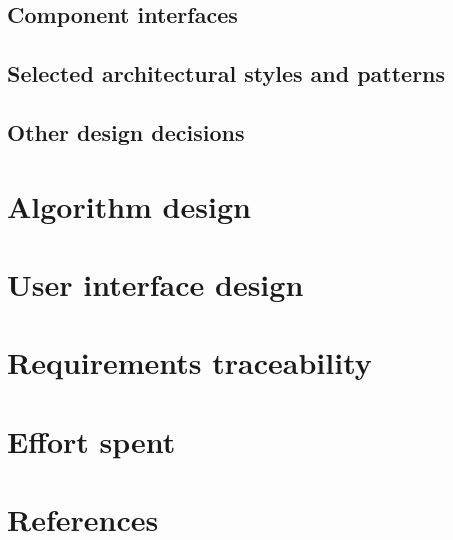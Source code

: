 \documentclass[12pt, a4paper]{article}
\begin{document}
		\subsection{Component interfaces}
		\label{sec:components_interfaces}
			

		\subsection{Selected  architectural  styles  and  patterns}
			
			

		\subsection{Other design decisions}
			

	\newpage
	\section{Algorithm design}
	\label{sec:algorithm_design}
		

	\newpage
	\section{User interface design}
	\label{sec:user_interface_design}
		

	\newpage
	\section{Requirements traceability}
		

	\newpage
	\section{Effort spent}

	\newpage
	\section{References}
\end{document}
